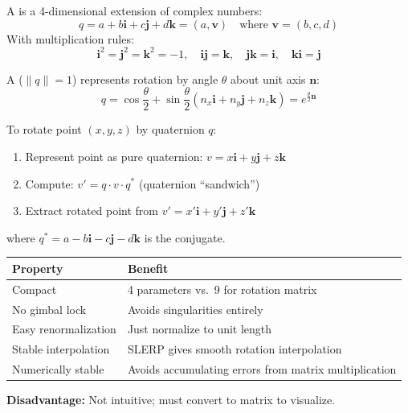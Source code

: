 \begin{defbox}[Quaternion]
A  is a 4-dimensional extension of complex numbers:
\[
q = a + b\mathbf{i} + c\mathbf{j} + d\mathbf{k} = (a, \mathbf{v}) \quad \text{where } \mathbf{v} = (b, c, d)
\]
With multiplication rules:
\[
\mathbf{i}^2 = \mathbf{j}^2 = \mathbf{k}^2 = -1, \quad \mathbf{ij} = \mathbf{k}, \quad \mathbf{jk} = \mathbf{i}, \quad \mathbf{ki} = \mathbf{j}
\]
\end{defbox}

\begin{defbox}
A  ($\|q\| = 1$) represents rotation by angle $\theta$ about unit axis $\mathbf{n}$:
\[
q = \cos\frac{\theta}{2} + \sin\frac{\theta}{2}(n_x\mathbf{i} + n_y\mathbf{j} + n_z\mathbf{k}) = e^{\frac{\theta}{2}\mathbf{n}}
\]
\end{defbox}

\begin{thmbox}
To rotate point $(x, y, z)$ by quaternion $q$:
\begin{enumerate}
  \item Represent point as pure quaternion: $v = x\mathbf{i} + y\mathbf{j} + z\mathbf{k}$
  \item Compute: $v' = q \cdot v \cdot q^*$ \quad (quaternion ``sandwich'')
  \item Extract rotated point from $v' = x'\mathbf{i} + y'\mathbf{j} + z'\mathbf{k}$
\end{enumerate}
where $q^* = a - b\mathbf{i} - c\mathbf{j} - d\mathbf{k}$ is the conjugate.
\end{thmbox}

\begin{keybox}
\begin{center}
\renewcommand{\arraystretch}{1.3}
\begin{tabular}{@{} l p{9cm} @{}}
\toprule
\textbf{Property} & \textbf{Benefit} \\
\midrule
Compact & 4 parameters vs.\ 9 for rotation matrix \\
No gimbal lock & Avoids singularities entirely \\
Easy renormalization & Just normalize to unit length \\
Stable interpolation & SLERP gives smooth rotation interpolation \\
Numerically stable & Avoids accumulating errors from matrix multiplication \\
\bottomrule
\end{tabular}
\end{center}
\textbf{Disadvantage:} Not intuitive; must convert to matrix to visualize.
\end{keybox}

